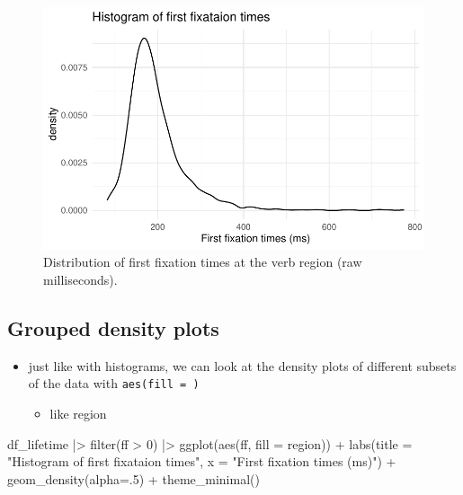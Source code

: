 \documentclass[
  letterpaper,
  DIV=11,
  numbers=noendperiod]{scrartcl}
\newenvironment{Shaded}{\begin{snugshade}}{\end{snugshade}}
\newcommand{\AttributeTok}[1]{\textcolor[rgb]{0.40,0.45,0.13}{#1}}
\newcommand{\DecValTok}[1]{\textcolor[rgb]{0.68,0.00,0.00}{#1}}
\newcommand{\FunctionTok}[1]{\textcolor[rgb]{0.28,0.35,0.67}{#1}}
\newcommand{\NormalTok}[1]{\textcolor[rgb]{0.00,0.23,0.31}{#1}}
\newcommand{\SpecialCharTok}[1]{\textcolor[rgb]{0.37,0.37,0.37}{#1}}
\newcommand{\StringTok}[1]{\textcolor[rgb]{0.13,0.47,0.30}{#1}}
\providecommand{\tightlist}{%
  \setlength{\itemsep}{0pt}\setlength{\parskip}{0pt}}\usepackage{longtable,booktabs,array}
\begin{document}
\begin{figure}[H]

{\centering \includegraphics{_data_viz_files/figure-pdf/unnamed-chunk-18-1.pdf}

}

\caption{Distribution of first fixation times at the verb region (raw
milliseconds).}

\end{figure}

\hypertarget{grouped-density-plots}{%
\subsection{Grouped density plots}\label{grouped-density-plots}}

\begin{itemize}
\tightlist
\item
  just like with histograms, we can look at the density plots of
  different subsets of the data with \texttt{aes(fill\ =\ )}

  \begin{itemize}
  \tightlist
  \item
    like region
  \end{itemize}
\end{itemize}

\begin{Shaded}
\begin{Highlighting}[numbers=left,,]
\NormalTok{df\_lifetime }\SpecialCharTok{|\textgreater{}} 
  \FunctionTok{filter}\NormalTok{(ff }\SpecialCharTok{\textgreater{}} \DecValTok{0}\NormalTok{) }\SpecialCharTok{|\textgreater{}} 
  \FunctionTok{ggplot}\NormalTok{(}\FunctionTok{aes}\NormalTok{(ff, }\AttributeTok{fill =}\NormalTok{ region)) }\SpecialCharTok{+} 
  \FunctionTok{labs}\NormalTok{(}\AttributeTok{title =} \StringTok{"Histogram of first fixataion times"}\NormalTok{,}
       \AttributeTok{x =} \StringTok{"First fixation times (ms)"}\NormalTok{) }\SpecialCharTok{+}
  \FunctionTok{geom\_density}\NormalTok{(}\AttributeTok{alpha=}\NormalTok{.}\DecValTok{5}\NormalTok{) }\SpecialCharTok{+}
  \FunctionTok{theme\_minimal}\NormalTok{()}
\end{Highlighting}
\end{Shaded}
\end{document}
